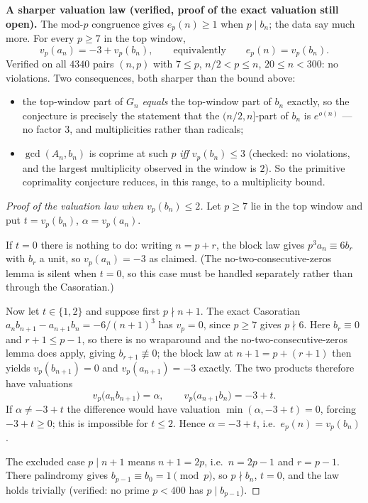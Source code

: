 \medskip
\noindent\textbf{A sharper valuation law (verified, proof of the exact valuation still open).}
The mod-$p$ congruence gives $e_p(n)\ge1$ when $p\mid b_n$; the data say much more.  For every
$p\ge7$ in the top window,
\[
  \boxed{\;v_p(a_n)=-3+v_p(b_n),\qquad\text{equivalently}\qquad e_p(n)=v_p(b_n).\;}
\]
Verified on all $4340$ pairs $(n,p)$ with $7\le p$, $n/2<p\le n$, $20\le n<300$: no violations.
Two consequences, both sharper than the bound above:
\begin{itemize}
\item the top-window part of $G_n$ \emph{equals} the top-window part of $b_n$ exactly, so the
conjecture is precisely the statement that the $(n/2,n]$-part of $b_n$ is $e^{o(n)}$ — no factor
$3$, and multiplicities rather than radicals;
\item $\gcd(A_n,b_n)$ is coprime at such $p$ \emph{iff} $v_p(b_n)\le3$ (checked: no violations,
and the largest multiplicity observed in the window is $2$).  So the primitive coprimality
conjecture reduces, in this range, to a multiplicity bound.
\end{itemize}
\begin{proof}[Proof of the valuation law when $v_p(b_n)\le2$]
Let $p\ge7$ lie in the top window and put $t=v_p(b_n)$, $\alpha=v_p(a_n)$.

If $t=0$ there is nothing to do: writing $n=p+r$, the block law gives $p^3a_n\equiv6b_r$ with
$b_r$ a unit, so $v_p(a_n)=-3$ as claimed.  (The no-two-consecutive-zeros lemma is silent when
$t=0$, so this case must be handled separately rather than through the Casoratian.)

Now let $t\in\{1,2\}$ and suppose first $p\nmid n+1$.  The exact Casoratian
$a_nb_{n+1}-a_{n+1}b_n=-6/(n+1)^3$ has $v_p=0$, since $p\ge7$ gives $p\nmid6$.  Here $b_r\equiv0$
and $r+1\le p-1$, so there is no wraparound and the no-two-consecutive-zeros lemma does apply,
giving $b_{r+1}\not\equiv0$; the block law at $n+1=p+(r+1)$ then yields $v_p(b_{n+1})=0$ and
$v_p(a_{n+1})=-3$ exactly.  The two products therefore
have valuations
\[
  v_p\bigl(a_nb_{n+1}\bigr)=\alpha,\qquad
  v_p\bigl(a_{n+1}b_n\bigr)=-3+t .
\]
If $\alpha\ne-3+t$ the difference would have valuation $\min(\alpha,-3+t)=0$, forcing
$-3+t\ge0$; this is impossible for $t\le2$.  Hence $\alpha=-3+t$, i.e.\ $e_p(n)=v_p(b_n)$.

The excluded case $p\mid n+1$ means $n+1=2p$, i.e.\ $n=2p-1$ and $r=p-1$.  There palindromy
gives $b_{p-1}\equiv b_0=1\pmod p$, so $p\nmid b_n$, $t=0$, and the law holds trivially
(verified: no prime $p<400$ has $p\mid b_{p-1}$).
\end{proof}

